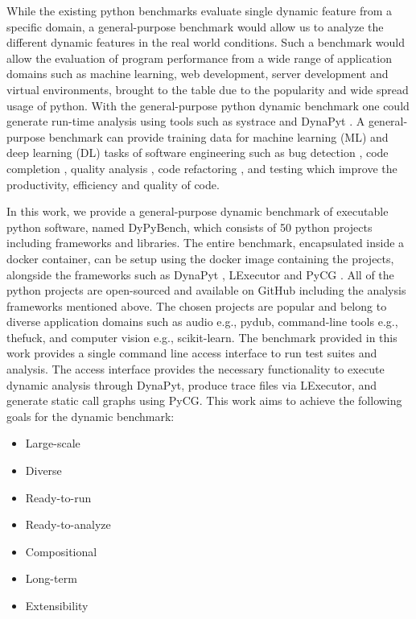 While the existing python benchmarks evaluate single dynamic feature from a specific domain, a general-purpose benchmark would allow us to analyze the different dynamic features in the real world conditions.
Such a benchmark would allow the evaluation of program performance from a wide range of application domains such as machine learning, web development, server development and virtual environments, brought to the table due to the popularity and wide spread usage of python.
With the general-purpose python dynamic benchmark one could generate run-time analysis using tools such as systrace \cite{systrace} and DynaPyt \cite{DynaPyt2022}.
A general-purpose benchmark can provide training data for machine learning (ML) and deep learning (DL) tasks of software engineering such as bug detection \cite{DeepBugs2018}, code completion \cite{code_completion}, quality analysis \cite{Code_analysis_1, Code_analysis_2}, code refactoring \cite{code_refactoring}, and testing \cite{testing_1, testing_2, testing_3} which improve the productivity, efficiency and quality of code.

In this work, we provide a general-purpose dynamic benchmark of executable python software, named DyPyBench, which consists of 50 python projects including frameworks and libraries.
The entire benchmark, encapsulated inside a docker container, can be setup using the docker image containing the projects, alongside the frameworks such as DynaPyt \cite{DynaPyt2022}, LExecutor \cite{LExecutor_2023} and PyCG \cite{PyCG_2021}.
All of the python projects are open-sourced and available on GitHub \cite{github} including the analysis frameworks mentioned above.
The chosen projects are popular and belong to diverse application domains such as audio e.g., pydub, command-line tools e.g., thefuck, and computer vision e.g., scikit-learn.
The benchmark provided in this work provides a single command line access interface to run test suites and analysis.
The access interface provides the necessary functionality to execute dynamic analysis through DynaPyt, produce trace files via LExecutor, and generate static call graphs using PyCG.
This work aims to achieve the following goals for the dynamic benchmark:
\begin{itemize}
    \item Large-scale
    \item Diverse
    \item Ready-to-run
    \item Ready-to-analyze
    \item Compositional
    \item Long-term
    \item Extensibility
\end{itemize}

